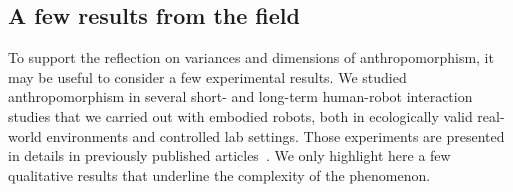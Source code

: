 \documentclass{frontiersSCNS} %
\begin{document}
\subsection{A few results from the field}

To support the reflection on variances and dimensions of anthropomorphism, it may be 
useful to consider a few experimental
results. We studied anthropomorphism in several short- and long-term
human-robot interaction studies that we carried out with embodied robots, both
in ecologically valid real-world environments and controlled lab settings. Those
experiments are presented in details in previously published
articles~\citep{fink_anthropomorphic_2012, fink_living_2013, fink2014which,
lemaignan2014dynamics}. We only highlight here a few qualitative results that
underline the complexity of the phenomenon.
\end{document}
